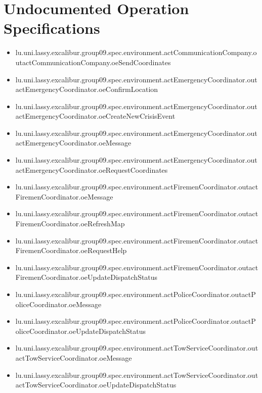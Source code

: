 \section[Undocumented Operation Specifications]{Undocumented Operation Specifications}
\begin{itemize}
\item lu.uni.lassy.excalibur.group09.spec.environment.actCommunicationCompany.outactCommunicationCompany.oeSendCoordinates 
\item lu.uni.lassy.excalibur.group09.spec.environment.actEmergencyCoordinator.outactEmergencyCoordinator.oeConfirmLocation 
\item lu.uni.lassy.excalibur.group09.spec.environment.actEmergencyCoordinator.outactEmergencyCoordinator.oeCreateNewCrisisEvent 
\item lu.uni.lassy.excalibur.group09.spec.environment.actEmergencyCoordinator.outactEmergencyCoordinator.oeMessage 
\item lu.uni.lassy.excalibur.group09.spec.environment.actEmergencyCoordinator.outactEmergencyCoordinator.oeRequestCoordinates 
\item lu.uni.lassy.excalibur.group09.spec.environment.actFiremenCoordinator.outactFiremenCoordinator.oeMessage 
\item lu.uni.lassy.excalibur.group09.spec.environment.actFiremenCoordinator.outactFiremenCoordinator.oeRefreshMap 
\item lu.uni.lassy.excalibur.group09.spec.environment.actFiremenCoordinator.outactFiremenCoordinator.oeRequestHelp 
\item lu.uni.lassy.excalibur.group09.spec.environment.actFiremenCoordinator.outactFiremenCoordinator.oeUpdateDispatchStatus 
\item lu.uni.lassy.excalibur.group09.spec.environment.actPoliceCoordinator.outactPoliceCoordinator.oeMessage 
\item lu.uni.lassy.excalibur.group09.spec.environment.actPoliceCoordinator.outactPoliceCoordinator.oeUpdateDispatchStatus 
\item lu.uni.lassy.excalibur.group09.spec.environment.actTowServiceCoordinator.outactTowServiceCoordinator.oeMessage 
\item lu.uni.lassy.excalibur.group09.spec.environment.actTowServiceCoordinator.outactTowServiceCoordinator.oeUpdateDispatchStatus 
\end{itemize}








